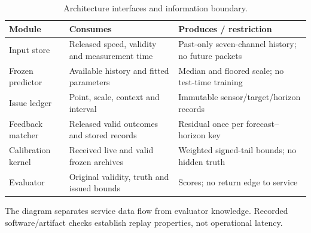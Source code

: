 \begin{table}[p]\caption{Architecture interfaces and information boundary.}\label{tab:architecture-contract}\centering\small
\begin{tabular}{>{\raggedright\arraybackslash}p{2.8cm}>{\raggedright\arraybackslash}p{4.0cm}>{\raggedright\arraybackslash}p{5.5cm}}\toprule
Module & Consumes & Produces / restriction \\\midrule
Input store & Released speed, validity and measurement time & Past-only seven-channel history; no future packets \\
Frozen predictor & Available history and fitted parameters & Median and floored scale; no test-time training \\
Issue ledger & Point, scale, context and interval & Immutable sensor/target/horizon records \\
Feedback matcher & Released valid outcomes and stored records & Residual once per forecast--horizon key \\
Calibration kernel & Received live and valid frozen archives & Weighted signed-tail bounds; no hidden truth \\
Evaluator & Original validity, truth and issued bounds & Scores; no return edge to service \\
\bottomrule\end{tabular}\par\smallskip\footnotesize The diagram separates service data flow from evaluator knowledge. Recorded software/artifact checks establish replay properties, not operational latency.\end{table}\clearpage
